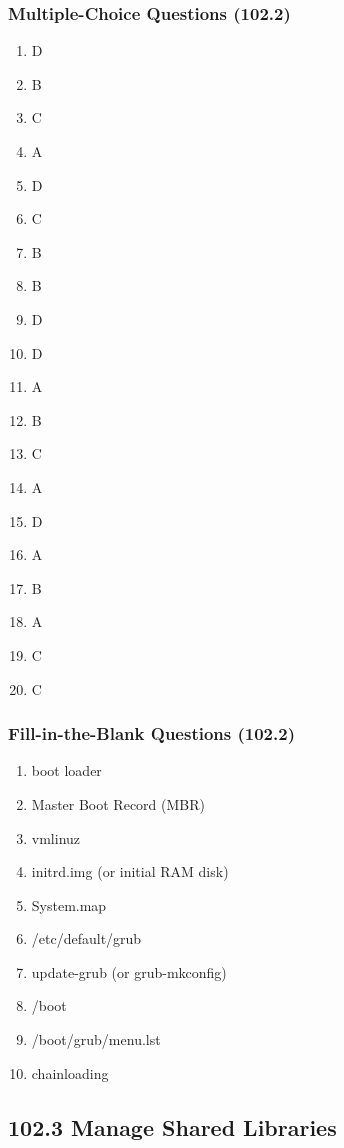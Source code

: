 \documentclass[a4paper]{report}
\begin{document}
\subsubsection*{Multiple-Choice Questions (102.2)}
\begin{enumerate}[1.]
    \item D
    \item B
    \item C
    \item A
    \item D
    \item C
    \item B
    \item B
    \item D
    \item D
    \item A
    \item B
    \item C
    \item A
    \item D
    \item A
    \item B
    \item A
    \item C
    \item C
\end{enumerate}


\subsubsection*{Fill-in-the-Blank Questions (102.2)}
\begin{enumerate}[1.]
    \item boot loader
    \item Master Boot Record (MBR)
    \item vmlinuz
    \item initrd.img (or initial RAM disk)
    \item System.map
    \item /etc/default/grub
    \item update-grub (or grub-mkconfig)
    \item /boot
    \item /boot/grub/menu.lst
    \item chainloading
\end{enumerate}

\subsection*{102.3 Manage Shared Libraries}
\end{document}
